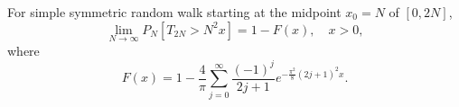 For simple symmetric random walk starting at the midpoint \(x_0 = N\) of \([0,2N]\),
\[
\lim_{N \to \infty} P_N[T_{2N} > N^2 x] = 1 - F(x), \quad x > 0,
\]
where
\[
F(x) = 1 - \frac{4}{\pi} \sum_{j=0}^{\infty} \frac{(-1)^j}{2j+1} e^{-\frac{\pi^2}{8}(2j+1)^2 x}.
\]

